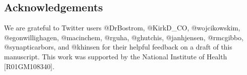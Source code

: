 \subsection*{Acknowledgements}
We are grateful to Twitter users @DrBostrom,
@KirkD\_CO,
@wojcikowskim,
@egonwillighagen,
@macinchem,
@rguha,
@ghutchis,
@janhjensen,
@rmcgibbo, 
@synapticarbors, and
@khinsen 
for their helpful feedback on a draft of this manuscript.
This work was supported by the National Institute of Health [R01GM108340].